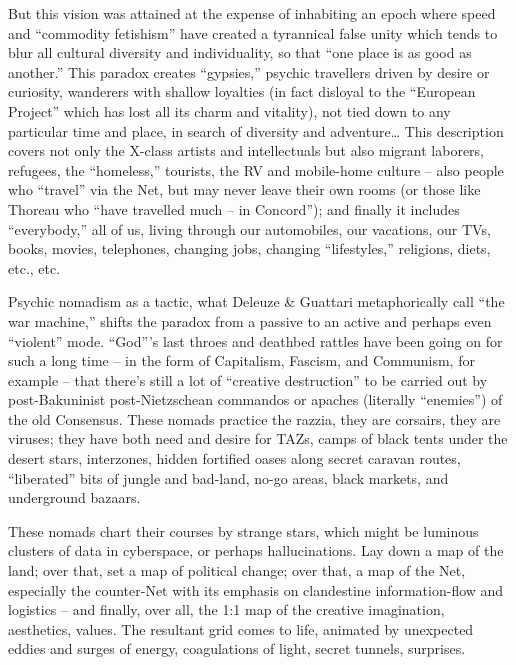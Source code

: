 \documentclass[a4paper,english,10pt,twoside]{article}
\begin{document}
\begin{enumerate}
{\medskip
But this vision was attained at the expense of inhabiting an epoch where speed and \enquote{commodity fetishism} have created a tyrannical false unity which tends to blur all cultural diversity and individuality, so that \enquote{one place is as good as another.} This paradox creates \enquote{gypsies,} psychic travellers driven by desire or curiosity, wanderers with shallow loyalties (in fact disloyal to the \enquote{European Project} which has lost all its charm and vitality), not tied down to any particular time and place, in search of diversity and adventure… This description covers not only the X-class artists and intellectuals but also migrant laborers, refugees, the \enquote{homeless,} tourists, the RV and mobile-home culture -- also people who \enquote{travel} via the Net, but may never leave their own rooms (or those like Thoreau who \enquote{have travelled much -- in Concord}); and finally it includes \enquote{everybody,} all of us, living through our automobiles, our vacations, our TVs, books, movies, telephones, changing jobs, changing \enquote{lifestyles,} religions, diets, etc., etc.

\medskip
Psychic nomadism as a tactic, what Deleuze \& Guattari metaphorically call \enquote{the war machine,} shifts the paradox from a passive to an active and perhaps even \enquote{violent} mode. \enquote{God}'s last throes and deathbed rattles have been going on for such a long time -- in the form of Capitalism, Fascism, and Communism, for example -- that there's still a lot of \enquote{creative destruction} to be carried out by post-Bakuninist post-Nietzschean commandos or apaches (literally \enquote{enemies}) of the old Consensus. These nomads practice the razzia, they are corsairs, they are viruses; they have both need and desire for TAZs, camps of black tents under the desert stars, interzones, hidden fortified oases along secret caravan routes, \enquote{liberated} bits of jungle and bad-land, no-go areas, black markets, and underground bazaars.

\medskip
These nomads chart their courses by strange stars, which might be luminous clusters of data in cyberspace, or perhaps hallucinations. Lay down a map of the land; over that, set a map of political change; over that, a map of the Net, especially the counter-Net with its emphasis on clandestine information-flow and logistics -- and finally, over all, the 1:1 map of the creative imagination, aesthetics, values. The resultant grid comes to life, animated by unexpected eddies and surges of energy, coagulations of light, secret tunnels, surprises.}
\end{enumerate}
\end{document}
